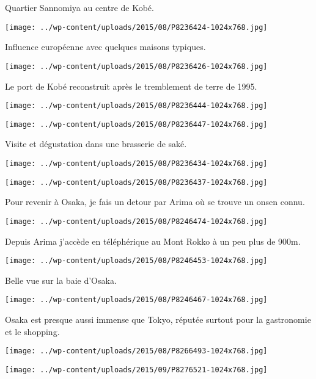 \pagebreak
 Quartier Sannomiya au centre de Kobé.
\begin{center} \texttt{[image: ../wp-content/uploads/2015/08/P8236424-1024x768.jpg]} \end{center}

 Influence européenne avec quelques maisons typiques.
\begin{center} \texttt{[image: ../wp-content/uploads/2015/08/P8236426-1024x768.jpg]} \end{center}

\pagebreak
 Le port de Kobé reconstruit après le tremblement de terre de 1995.
\begin{center} \texttt{[image: ../wp-content/uploads/2015/08/P8236444-1024x768.jpg]} \end{center}
\begin{center} \texttt{[image: ../wp-content/uploads/2015/08/P8236447-1024x768.jpg]} \end{center}

\pagebreak
 Visite et dégustation dans une brasserie de saké.
\begin{center} \texttt{[image: ../wp-content/uploads/2015/08/P8236434-1024x768.jpg]} \end{center}
\begin{center} \texttt{[image: ../wp-content/uploads/2015/08/P8236437-1024x768.jpg]} \end{center}

\pagebreak
 Pour revenir à Osaka, je fais un detour par Arima où se trouve un onsen connu.
\begin{center} \texttt{[image: ../wp-content/uploads/2015/08/P8246474-1024x768.jpg]} \end{center}

 Depuis Arima j'accède en téléphérique au Mont Rokko à un peu plus de 900m.
\begin{center} \texttt{[image: ../wp-content/uploads/2015/08/P8246453-1024x768.jpg]} \end{center}

\pagebreak
 Belle vue sur la baie d'Osaka.
\begin{center} \texttt{[image: ../wp-content/uploads/2015/08/P8246467-1024x768.jpg]} \end{center}

 Osaka est presque aussi immense que Tokyo, réputée surtout pour la gastronomie et le shopping. 
\begin{center} \texttt{[image: ../wp-content/uploads/2015/08/P8266493-1024x768.jpg]} \end{center}
\begin{center} \texttt{[image: ../wp-content/uploads/2015/09/P8276521-1024x768.jpg]} \end{center}

